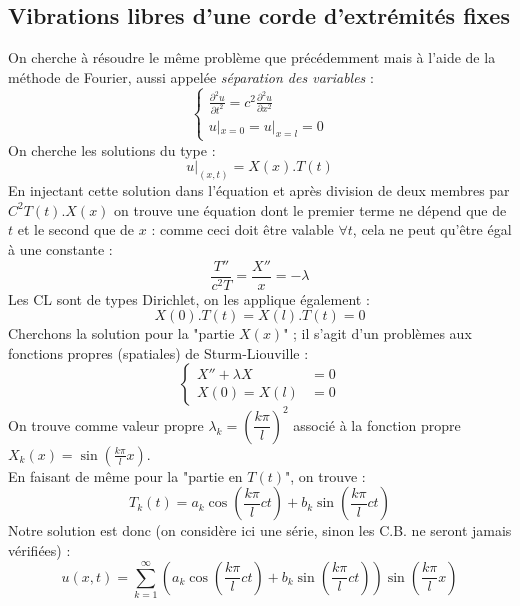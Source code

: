 \documentclass	[11pt, a4paper, openany]{book}
\newcommand{\serie}{\sum_{k=1}^\infty}
\begin{document}
	\subsection{Vibrations libres d'une corde d'extrémités fixes}
	On cherche à résoudre le même problème que précédemment mais à l'aide de la méthode de 
	Fourier, aussi appelée \textit{séparation des variables} :
	\begin{equation}
	\left\{\begin{array}{l}
	\frac{\partial^2u}{\partial t^2} = c^2\frac{\partial^2u}{\partial x^2}\\
	u|_{x=0} = u|_{x=l} = 0
	\end{array}\right.
	\end{equation}
	On cherche les solutions du type :
	\begin{equation}
	u|_{(x,t)} = X(x).T(t)
	\end{equation}
	En injectant cette solution dans l'équation et après division de deux membres par $C^2
	T(t).X(x)$ on trouve une équation dont le premier terme ne dépend que de $t$ et le 
	second que de $x$ : comme ceci doit être valable $\forall t$, cela ne peut qu'être 
	égal à une constante :
	\begin{equation}
	\dfrac{T''}{c^2T} = \dfrac{X''}{x} = -\lambda
	\end{equation}
	Les CL sont de types Dirichlet, on les applique également :
	\begin{equation}
	X(0).T(t) = X(l).T(t) = 0
	\end{equation}
	Cherchons la solution pour la "partie $X(x)$" ; il s'agit d'un problèmes aux fonctions
	propres (spatiales) de Sturm-Liouville :
	\begin{equation}
	\left\{\begin{array}{ll}
	X'' + \lambda X &=0\\
	X(0) = X(l) &=0
	\end{array}\right.
	\end{equation}
	On trouve comme valeur propre $\lambda_k = \left(\dfrac{k\pi}{l}\right)^2$ associé à 
	la fonction propre $X_k(x) = \sin\left(\frac{k\pi}{l}x\right)$.\\
	En faisant de même pour la "partie en $T(t)$", on trouve :
	\begin{equation}
	T_k(t) = a_k\cos\left(\frac{k\pi}{l}ct\right)+b_k\sin\left(\frac{k\pi}{l}ct\right)
	\end{equation}
	Notre solution est donc (on considère ici une série, sinon les C.B. ne seront jamais
	vérifiées) :
	\begin{equation}
	u(x,t) = \serie\left(a_k\cos\left(\frac{k\pi}{l}ct\right)+b_k\sin\left(\frac{k\pi}{l}ct\right)
	\right)\sin\left(\frac{k\pi}{l}x\right)
	\end{equation}
\end{document}
